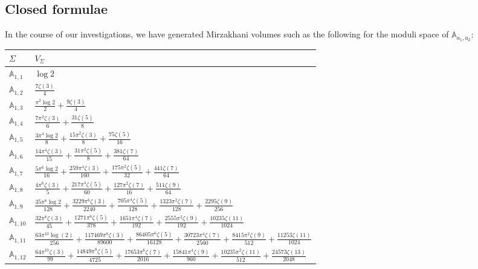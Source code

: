 \documentclass{amsart}
\theoremstyle{definition}
\begin{document}
\subsection{Closed formulae}



In the course of our investigations, we have generated Mirzakhani volumes such as the following for the moduli space of $\mathbb{A}_{a_1,a_2}$:

\begin{center}
\begin{tabular}{ |l|l| } 
\hline
    $\Sigma$ & $V_\Sigma$\\ \hline
    $\mathbb{A}_{1,1}$ & $\log 2$  \\ \hline
    $\mathbb{A}_{1,2}$  & $\frac{7\zeta(3)}{4}$  \\ \hline
    $\mathbb{A}_{1,3}$ & $\frac{\pi ^2 \log 2}{2} +\frac{9\zeta (3)}{4} $    \\ \hline
    $\mathbb{A}_{1,4}$ & $\frac{7\pi ^2 \zeta (3)}{6}+\frac{31 \zeta (5)}{8}$   \\ \hline
    $\mathbb{A}_{1,5}$ & $
    \frac{3\pi^4\log 2}{8}+\frac{15\pi^2\zeta(3)}{8}+\frac{75\zeta(5)}{16}$  \\ \hline
    $\mathbb{A}_{1,6}$ & $\frac{14 \pi ^4 \zeta (3)}{15}+\frac{31 \pi ^2 \zeta (5)}{8}+\frac{381 \zeta (7)}{64}$   \\ \hline
    $\mathbb{A}_{1,7}$ & $\frac{5\pi^6\log 2}{16}+\frac{259\pi^4\zeta(3)}{160}+\frac{175\pi^2\zeta(5)}{32}+\frac{441\zeta(7)}{64}$  \\ \hline
    $\mathbb{A}_{1,8}$ & $\frac{4\pi^6\zeta(3)}{5}+\frac{217\pi^4\zeta(5)}{60}+\frac{127\pi^2\zeta(7)}{16}+\frac{511\zeta(9)}{64}$  \\ \hline
    $\mathbb{A}_{1,9}$ & $\frac{35\pi^8\log2}{128}+\frac{3229\pi^6\zeta(3)}{2240}+\frac{705\pi^4\zeta(5)}{128}+\frac{1323\pi^2\zeta(7)}{128}+\frac{2295\zeta(9)}{256}$  \\ \hline
    $\mathbb{A}_{1,10}$ & $\frac{32 \pi^8 \zeta(3)}{45} + \frac{1271 \pi^6 \zeta(5)}{378} + \frac{1651 \pi^4 \zeta(7)}{192} + \frac{2555 \pi^2 \zeta(9)}{192} + \frac{10235 \zeta(11)}{1024}$  \\ \hline
    $\mathbb{A}_{1,11}$ & $\frac{63 \pi^{10} \log(2)}{256} + \frac{117469 \pi^8 \zeta(3)}{89600} + \frac{86405 \pi^6 \zeta(5)}{16128} + \frac{30723 \pi^4 \zeta(7)}{2560} + \frac{8415 \pi^2 \zeta(9)}{512} + \frac{11253 \zeta(11)}{1024}$    \\ \hline
    $\mathbb{A}_{1,12}$ & $\frac{64 \pi^{10} \zeta(3)}{99} + \frac{14849 \pi^8 \zeta(5)}{4725} + \frac{17653 \pi^6 \zeta(7)}{2016} + \frac{15841 \pi^4 \zeta(9)}{960} + \frac{10235 \pi^2 \zeta(11)}{512} + \frac{24573 \zeta(13)}{2048}$    \\ \hline

\end{tabular}
\end{center}
\end{document}
